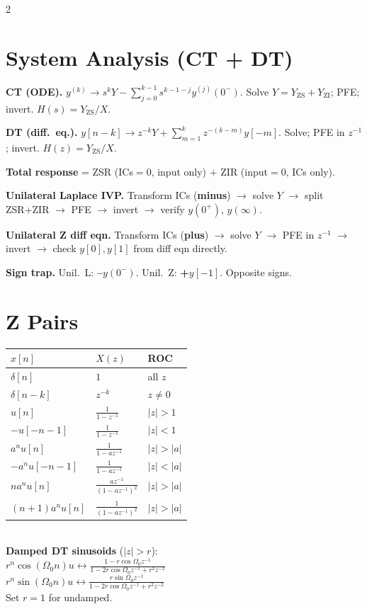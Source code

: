 \documentclass[11pt,landscape]{extarticle}
\begin{document}
\begin{paracol}{2}
\switchcolumn

\section*{System Analysis (CT + DT)}
\textbf{CT (ODE).} $y^{(k)}\!\to\! s^k Y - \sum_{j=0}^{k-1}\! s^{k-1-j} y^{(j)}(0^-)$. Solve $Y=Y_{\text{ZS}}+Y_{\text{ZI}}$; PFE; invert. $H(s)=Y_{\text{ZS}}/X$.

\textbf{DT (diff.\ eq.).} $y[n{-}k]\to z^{-k}Y + \sum_{m=1}^k z^{-(k-m)}y[-m]$. Solve; PFE in $z^{-1}$; invert. $H(z)=Y_{\text{ZS}}/X$.

\textbf{Total response} = ZSR (ICs$=0$, input only) $+$ ZIR (input$=0$, ICs only).

\textbf{Unilateral Laplace IVP.} Transform ICs (\textbf{minus}) $\to$ solve $Y$ $\to$ split ZSR+ZIR $\to$ PFE $\to$ invert $\to$ verify $y(0^+)$, $y(\infty)$.

\textbf{Unilateral Z diff eqn.} Transform ICs (\textbf{plus}) $\to$ solve $Y$ $\to$ PFE in $z^{-1}$ $\to$ invert $\to$ check $y[0],y[1]$ from diff eqn directly.

\textbf{Sign trap.} Unil.\ L: \textbf{--}$y(0^-)$. Unil.\ Z: \textbf{+}$y[-1]$. Opposite signs.

\switchcolumn*

\section*{Z Pairs}
\begin{tabular}{@{}l l l@{}}
\toprule
$x[n]$ & $X(z)$ & ROC \\
\midrule
$\delta[n]$ & $1$ & all $z$ \\
$\delta[n{-}k]$ & $z^{-k}$ & $z\ne 0$ \\
$u[n]$ & $\tfrac{1}{1-z^{-1}}$ & $|z|{>}1$ \\
$-u[-n{-}1]$ & $\tfrac{1}{1-z^{-1}}$ & $|z|{<}1$ \\
$a^n u[n]$ & $\tfrac{1}{1-az^{-1}}$ & $|z|{>}|a|$ \\
$-a^n u[-n{-}1]$ & $\tfrac{1}{1-az^{-1}}$ & $|z|{<}|a|$ \\
$na^n u[n]$ & $\tfrac{az^{-1}}{(1-az^{-1})^2}$ & $|z|{>}|a|$ \\
$(n{+}1)a^n u[n]$ & $\tfrac{1}{(1-az^{-1})^2}$ & $|z|{>}|a|$ \\
\bottomrule
\end{tabular}\\[4pt]
\textbf{Damped DT sinusoids} ($|z|{>}r$):\\[2pt]
{\footnotesize
$r^n\!\cos(\Omega_0 n)u\!\leftrightarrow\!\tfrac{1-r\cos\Omega_0 z^{-1}}{1-2r\cos\Omega_0 z^{-1}+r^2 z^{-2}}$\\[3pt]
$r^n\!\sin(\Omega_0 n)u\!\leftrightarrow\!\tfrac{r\sin\Omega_0 z^{-1}}{1-2r\cos\Omega_0 z^{-1}+r^2 z^{-2}}$\\[2pt]
Set $r{=}1$ for undamped.
}


\end{paracol}
\end{document}
